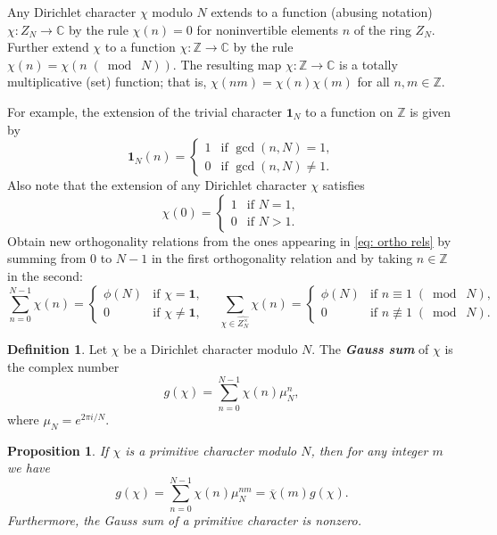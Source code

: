 \documentclass[10pt,leqno,twoside]{article}
\theoremstyle{plain}
\newtheorem{proposition}[lem]{Proposition}
\theoremstyle{definition}
\newtheorem{definition/}[lem]{Definition}
\newenvironment{definition}
  {\renewcommand{\qedsymbol}{\textdagger}%
   \pushQED{\qed}\begin{definition/}}
  {\popQED\end{definition/}}
\numberwithin{equation}{section}
\numberwithin{lem}{section}
\newcommand{\textib}[1]{\textbf{\textit{#1\index{#1}}}} %
\newcommand{\smod}[1]{\;(\bmod\; #1)}
\begin{document}
Any Dirichlet character $\chi$ modulo $N$ extends to a function (abusing notation) $\chi\colon Z_N\to\mathbb C$ by the rule $\chi(n) = 0$ for noninvertible elements $n$ of the ring $Z_N$. Further extend $\chi$ to a function $\chi\colon\mathbb Z\to\mathbb C$ by the rule $\chi(n) = \chi(n\smod N)$. The resulting map $\chi\colon \mathbb Z\to \mathbb C$ is a totally multiplicative (set) function; that is, $\chi(nm) = \chi(n)\chi(m)$ for all $n,m\in \mathbb Z$.

For example, the extension of the trivial character $\mathbf 1_N$ to a function on $\mathbb Z$ is given by
\[\mathbf 1_N(n) = \begin{cases}
    1 & \text{if $\gcd(n,N)=1$},\\
    0 & \text{if $\gcd(n,N)\neq1$}.
\end{cases}\]
Also note that the extension of any Dirichlet character $\chi$ satisfies 
\[\chi(0) = \begin{cases}
    1 & \text{if $N = 1$},\\
    0 & \text{if $N > 1$}.
\end{cases}\]
Obtain new orthogonality relations from the ones appearing in \cref{eq: ortho rels} by summing from $0$ to $N-1$ in the first orthogonality relation and by taking $n\in\mathbb Z$ in the second:
\begin{equation}\label{eq: new ortho rels}
    \sum_{n=0}^{N-1}\chi(n) = \begin{cases}
        \phi(N) & \text{if $\chi = \mathbf 1$},\\
        0 & \text{if $\chi\neq \mathbf 1$},
    \end{cases}\quad\sum_{\chi\in \widehat{Z_N^\times}}\chi(n) = \begin{cases}
        \phi(N) & \text{if $n\equiv 1\smod N$},\\
        0 & \text{if $n\not\equiv 1\smod N$}.
    \end{cases} 
\end{equation}
\begin{definition}
    Let $\chi$ be a Dirichlet character modulo $N$. The \textib{Gauss sum} of $\chi$ is the complex number
    \[g(\chi) = \sum_{n=0}^{N-1}\chi(n)\mu_N^n,\] where $\mu_N = e^{2\pi i/N}$.
\end{definition}
\begin{proposition}
    If $\chi$ is a primitive character modulo $N$, then for any integer $m$ we have 
    \[g(\chi) = \sum_{n=0}^{N-1}\chi(n)\mu_N^{nm} = \overline\chi(m)g(\chi).\] Furthermore, the Gauss sum of a primitive character is nonzero.
\end{proposition}
\end{document}
